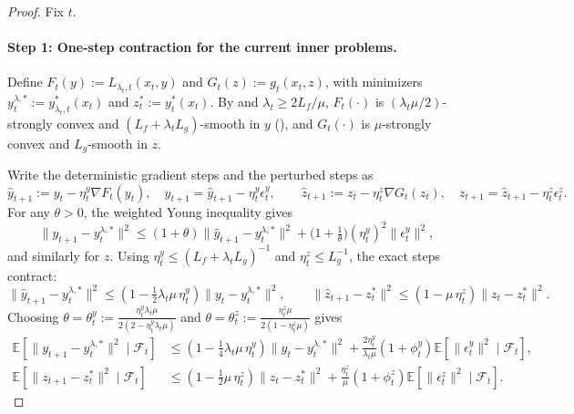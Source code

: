 \documentclass{uai2026} %
\newcommand{\EE}{\mathbb{E}}
\newcommand{\F}{\mathcal{F}}
\begin{document}
\begin{proof}
Fix $t$.

\paragraph{Step 1: One-step contraction for the current inner problems.}
Define $F_t(y):=L_{\lambda_t,t}(x_t,y)$ and $G_t(z):=g_t(x_t,z)$, with minimizers
$y_t^{\lambda,*}:=y^{*}_{\lambda_t,t}(x_t)$ and $z_t^{*}:=y_t^{*}(x_t)$.
By  and $\lambda_t\ge 2L_f/\mu$, $F_t(\cdot)$ is $(\lambda_t\mu/2)$-strongly convex and $(L_f+\lambda_tL_g)$-smooth in $y$
(), and $G_t(\cdot)$ is $\mu$-strongly convex and $L_g$-smooth in $z$.

Write the deterministic gradient steps and the perturbed steps as
\[
\widehat y_{t+1}:=y_t-\eta_t^y\nabla F_t(y_t),\quad y_{t+1}=\widehat y_{t+1}-\eta_t^y\epsilon_t^y,
\qquad
\widehat z_{t+1}:=z_t-\eta_t^z\nabla G_t(z_t),\quad z_{t+1}=\widehat z_{t+1}-\eta_t^z\epsilon_t^z.
\]
For any $\theta>0$, the weighted Young inequality gives
\[
\|y_{t+1}-y_t^{\lambda,*}\|^2
\le (1+\theta)\|\widehat y_{t+1}-y_t^{\lambda,*}\|^2+\Big(1+\tfrac{1}{\theta}\Big)(\eta_t^y)^2\|\epsilon_t^y\|^2,
\]
and similarly for $z$. Using $\eta_t^y\le (L_f+\lambda_tL_g)^{-1}$ and $\eta_t^z\le L_g^{-1}$, the exact steps contract:
\[
\|\widehat y_{t+1}-y_t^{\lambda,*}\|^2\le (1-\tfrac12\lambda_t\mu\,\eta_t^y)\|y_t-y_t^{\lambda,*}\|^2,\qquad
\|\widehat z_{t+1}-z_t^{*}\|^2\le (1-\mu\,\eta_t^z)\|z_t-z_t^{*}\|^2.
\]
Choosing $\theta=\theta_t^y:=\frac{\eta_t^y\lambda_t\mu}{2(2-\eta_t^y\lambda_t\mu)}$ and $\theta=\theta_t^z:=\frac{\eta_t^z\mu}{2(1-\eta_t^z\mu)}$
gives
\begin{align*}
\EE[\|y_{t+1}-y_t^{\lambda,*}\|^2\mid\F_t]
&\le (1-\tfrac14\lambda_t\mu\,\eta_t^y)\|y_t-y_t^{\lambda,*}\|^2
+\frac{2\eta_t^y}{\lambda_t\mu}(1+\phi_t^y)\EE[\|\epsilon_t^y\|^2\mid\F_t],\\
\EE[\|z_{t+1}-z_t^{*}\|^2\mid\F_t]
&\le (1-\tfrac12\mu\,\eta_t^z)\|z_t-z_t^{*}\|^2
+\frac{\eta_t^z}{\mu}(1+\phi_t^z)\EE[\|\epsilon_t^z\|^2\mid\F_t].
\end{align*}


\end{proof}
\end{document}
